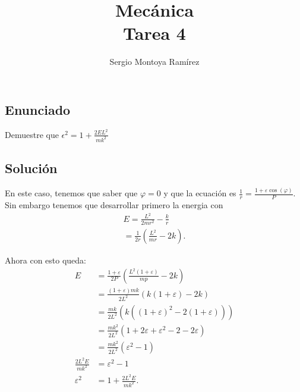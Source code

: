 \documentclass{report}
\title{\Huge{Mecánica}\\Tarea 4}
\author{\huge{Sergio Montoya Ramírez}}
\date{}
\begin{document}
\maketitle
\newpage%
\tableofcontents
\pagebreak

\chapter{}

\section{Enunciado}

Demuestre que $\epsilon^2=1+\frac{2EL^2}{mk^2}$

\section{Solución}

En este caso, tenemos que saber que $\varphi = 0$ y que la ecuación es $\frac{1}{r}=\frac{1+\varepsilon\cos\left( \varphi \right) }{P}$. Sin embargo tenemos que desarrollar primero la energia con
\begin{align*}
  E = \frac{L^2}{2mr^2}- \frac{k}{r}\\
  =\frac{1}{2r}\left( \frac{L^2}{mr}- 2k \right)
.\end{align*}

Ahora con esto queda:
\begin{align*}
  E &= \frac{1 + \varepsilon}{2P}\left( \frac{L^2\left( 1+\varepsilon \right) }{mp}-2k \right) \\
  &= \frac{\left( 1+\varepsilon \right)  mk}{2L^2}\left( k\left( 1 + \varepsilon \right)  - 2k \right)  \\
  &= \frac{mk}{2L^2}\left( k\left( \left( 1+\varepsilon \right)^2 - 2\left( 1 + \varepsilon \right)   \right)  \right)   \\
  &= \frac{mk^2}{2L^2}\left( 1 + 2\varepsilon + \varepsilon^2 - 2 - 2\varepsilon \right)  \\
  &= \frac{ mk^2}{2L^2}\left( \varepsilon^2-1 \right)  \\
  \frac{2L^2 E}{mk^2} &= \varepsilon^2 - 1 \\
  \varepsilon^2 &= 1 + \frac{2L^2 E}{mk^2}
.\end{align*}

\chapter{}
\end{document}
